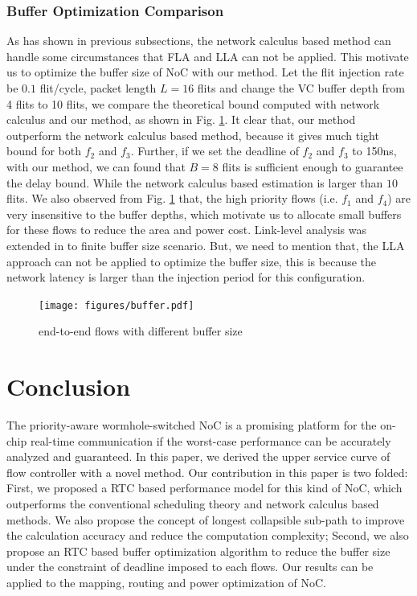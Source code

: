 \documentclass[10pt,journal]{IEEEtran}
\begin{document}
\subsubsection{Buffer Optimization Comparison}
As has shown in previous subsections, the network calculus based method \cite{Qian489900} can handle some circumstances that FLA and LLA can not be applied. This motivate us to optimize the buffer size of NoC with our method. Let the flit injection rate be $0.1$ flit/cycle, packet length $L=16$ flits and change the VC buffer depth from 4 flits to 10 flits, we compare the theoretical bound computed with network calculus and our method, as shown in Fig. \ref{buffer}. It clear that, our method outperform the network calculus based method, because it gives much tight bound for both $f_2$ and $f_3$. Further, if we set the deadline of $f_2$ and $f_3$ to 150ns, with our method, we can found that $B=8$ flits is sufficient enough to guarantee the delay bound. While the network calculus based estimation is larger than $10$ flits. We also observed from Fig. \ref{buffer} that, the high priority flows (i.e. $f_1$ and $f_4$) are very insensitive to the buffer depths, which motivate us to allocate small buffers for these flows to reduce the area and power cost. Link-level analysis was extended in \cite{189} to finite buffer size scenario. But, we need to mention that, the LLA approach can not be applied to optimize the buffer size, this is because the network latency is larger than the injection period for this configuration.
\begin{figure}
  \centering
  \texttt{[image: figures/buffer.pdf]}\\
  \caption{end-to-end flows with different buffer size}\label{buffer}
\end{figure}

\section{Conclusion}\label{conclusion}
The priority-aware wormhole-switched NoC is a promising platform for the on-chip real-time communication if the worst-case performance can be accurately analyzed and guaranteed. In this paper, we derived the upper service curve of flow controller with a novel method. Our contribution in this paper is two folded: First, we proposed a RTC based performance model for this kind of NoC, which outperforms the conventional scheduling theory and network calculus based methods. We also propose the concept of longest collapsible sub-path to improve the calculation accuracy and reduce the computation complexity; Second, we also propose an RTC based buffer optimization algorithm to reduce the buffer size under the constraint of deadline imposed to each flows. Our results can be applied to the mapping, routing and power optimization of NoC.
\end{document}
